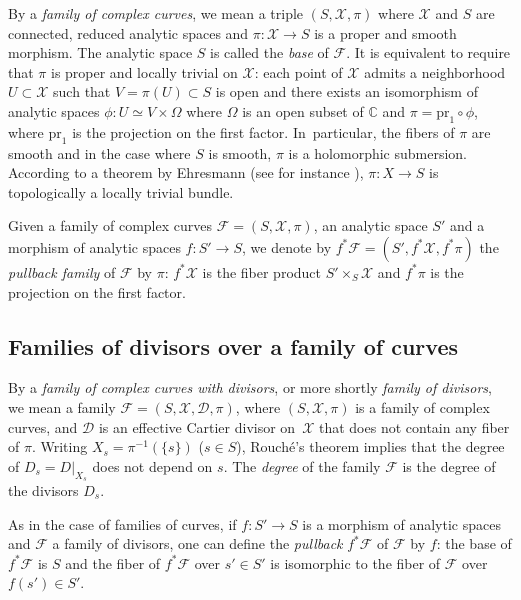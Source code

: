 \documentclass[JEP,XML,SOM,Unicode,NoEqCountersInSection,published]{cedram}
\newcommand{\C}{\mathbb C}
\newcommand{\pr}{\mathrm{pr}}
\theoremstyle{definition}
\theoremstyle{plain}
\begin{document}
By a \emph{family of complex curves}, we mean a triple $(S, \mathcal X, \pi)$ where $\mathcal X$ and $S$ are connected, reduced analytic spaces and $\pi: \mathcal X \to S$ is a proper and smooth morphism.
The analytic space $S$ is called the \emph{base} of $\mathcal F$.
It is equivalent to require that $\pi$ is proper and locally trivial on $\mathcal X$: each point of $\mathcal X$ admits a neighborhood $U \subset \mathcal X$ such that $V = \pi(U) \subset S$ is open and there exists an isomorphism of analytic spaces $\phi: U \simeq V \times \Omega$ where $\Omega$ is an open subset of $\C$ and $\pi = \pr_1 \circ \phi$, where $\pr_1$ is the projection on the first factor. In~particular, the fibers of $\pi$ are smooth and in the case where $S$ is smooth, $\pi$ is a holomorphic submersion.
According to a theorem by Ehresmann (see for instance \cite{voisin_en_I}), $\pi: X \to S$ is topologically a locally trivial bundle.

Given a family of complex curves $\mathcal F = (S, \mathcal X, \pi)$, an analytic space $S'$ and a morphism of analytic spaces $f: S' \to S$, we denote by $f^*\mathcal F = \left(S', f^* \mathcal X, f^* \pi\right)$ the \emph{pullback family} of $\mathcal F$ by $\pi$: $f^*\mathcal X$ is the fiber product $S' \times_S \mathcal X$ and $f^*\pi$ is the projection on the first factor.

\subsection{Families of divisors over a family of curves}\label{subsection_families_divisors}

By a \emph{family of complex curves with divisors}, or more shortly \emph{family of divisors}, we mean a family $\mathcal F = (S, \mathcal X, \mathcal D, \pi)$, where $(S, \mathcal X, \pi)$ is a family of complex curves, and $\mathcal D$ is an effective Cartier divisor on~$\mathcal X$ that does not contain any fiber of $\pi$.
Writing $X_s = \pi^{-1}(\{s\})$ ($s \in S$), Rouché's theorem implies that the degree of $D_s = D|_{X_s}$ does not depend on $s$.
The \emph{degree} of the family $\mathcal F$ is the degree of the divisors $D_s$.

As in the case of families of curves, if $f: S' \to S$ is a morphism of analytic spaces and $\mathcal F$ a family of divisors, one can define the \emph{pullback} $f^*\mathcal F$ of $\mathcal F$ by $f$: the base of $f^*\mathcal F$ is $S$ and the fiber of $f^* \mathcal F$ over $s' \in S'$ is isomorphic to the fiber of $\mathcal F$ over $f(s') \in S'$.
\end{document}
